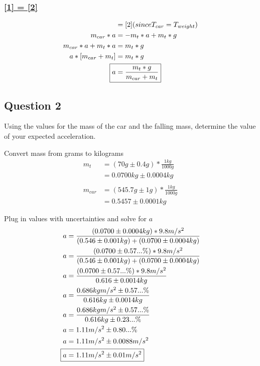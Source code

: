 \documentclass[12pt]{article}
\begin{document}
\subsubsection{\underline{[1] = [2]}}
\begin{align*}
[1] & = [2] (since T_{car} = T_{weight}) \\
m_{car}*a 		& = -m_{t}*a + m_{t}*g \\
m_{car}*a + m_{t}*a 	& = m_{t}*g \\
a*[m_{car} + m_{t}] 	& = m_{t}*g \\
\Aboxed{a & = \frac{m_{t}*g}{m_{car} + m_{t}}}
\end{align*}

\pagebreak

\subsection{Question 2}
Using the values for the mass of the car and the falling mass, determine the value of your expected acceleration.

Convert mass from grams to kilograms
\begin{align*}
m_{t} 		& = (70g\pm0.4g) * \frac{1kg}{1000g}\\
			& = 0.0700kg\pm0.0004kg\\
\\
m_{car}		& = (545.7g\pm1g) * \frac{1kg}{1000g}\\
			& = 0.5457\pm0.0001kg
\end{align*}

Plug in values with uncertainties and solve for $a$
\begin{align*}
a 			& = \frac{(0.0700\pm0.0004kg) * 9.8m/s^2}{(0.546\pm0.001kg) + (0.0700\pm0.0004kg)}\\
a 			& = \frac{(0.0700\pm0.57...\%) * 9.8m/s^2}{(0.546\pm0.001kg) + (0.0700\pm0.0004kg)}\\
a 			& = \frac{(0.0700\pm0.57...\%) * 9.8m/s^2}{0.616\pm0.0014kg}\\
a 			& = \frac{0.686kgm/s^2\pm0.57...\%}{0.616kg\pm0.0014kg}\\
a 			& = \frac{0.686kgm/s^2\pm0.57...\%}{0.616kg\pm0.23...\%}\\
a 			& = 1.11m/s^2 \pm 0.80...\%\\
a 			& = 1.11m/s^2 \pm 0.0088m/s^2\\
\Aboxed{a 	& = 1.11m/s^2 \pm 0.01m/s^2}
\end{align*}

\pagebreak
\end{document}
